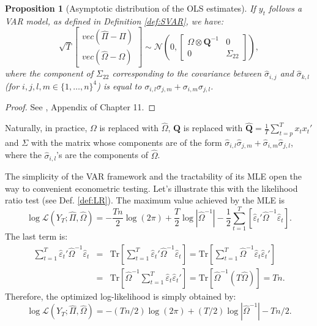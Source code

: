\documentclass[
  12pt,
]{book}
\newtheorem{proposition}{Proposition}[chapter]
\theoremstyle{definition}
\theoremstyle{definition}
\theoremstyle{definition}
\theoremstyle{definition}
\theoremstyle{remark}
\begin{document}
\begin{proposition}[Asymptotic distribution of the OLS estimates]
\protect\hypertarget{prp:OLSVAR2}{}\label{prp:OLSVAR2}If \(y_t\) follows a VAR model, as defined in Definition \ref{def:SVAR}, we have:
\begin{equation}
\sqrt{T}\left[
\begin{array}{c}
vec(\hat\Pi - \Pi)\\
vec(\hat\Omega - \Omega)
\end{array}
\right]
\sim \mathcal{N}\left(0,
\left[
\begin{array}{cc}
\Omega \otimes \mathbf{Q}^{-1} & 0\\
0 & \Sigma_{22}
\end{array}
\right]\right),\label{eq:asymptPi}
\end{equation}
where the component of \(\Sigma_{22}\) corresponding to the covariance between \(\hat\sigma_{i,j}\) and \(\hat\sigma_{k,l}\) (for \(i,j,l,m \in \{1,\dots,n\}^4\)) is equal to \(\sigma_{i,l}\sigma_{j,m}+\sigma_{i,m}\sigma_{j,l}\).
\end{proposition}

\begin{proof}
See \citet{Hamilton_1994}, Appendix of Chapter 11.
\end{proof}

Naturally, in practice, \(\Omega\) is replaced with \(\hat{\Omega}\), \(\mathbf{Q}\) is replaced with \(\hat{\mathbf{Q}} = \frac{1}{T}\sum_{t=p}^T x_t x_t'\) and \(\Sigma\) with the matrix whose components are of the form \(\hat\sigma_{i,l}\hat\sigma_{j,m}+\hat\sigma_{i,m}\hat\sigma_{j,l}\), where the \(\hat\sigma_{i,l}\)'s are the components of \(\hat\Omega\).

The simplicity of the VAR framework and the tractability of its MLE open the way to convenient econometric testing. Let's illustrate this with the likelihood ratio test (see Def. \ref{def:LR}). The maximum value achieved by the MLE is
\[
\log\mathcal{L}(Y_{T};\hat{\Pi},\hat{\Omega}) = -\frac{Tn}{2}\log(2\pi)+\frac{T}{2}\log\left|\hat{\Omega}^{-1}\right| -\frac{1}{2}\sum_{t=1}^{T}\left[\hat{\varepsilon}_{t}'\hat{\Omega}^{-1}\hat{\varepsilon}_{t}\right].
\]
The last term is:
\begin{eqnarray*}
\sum_{t=1}^{T}\hat{\varepsilon}_{t}'\hat{\Omega}^{-1}\hat{\varepsilon}_{t} &=& \mbox{Tr}\left[\sum_{t=1}^{T}\hat{\varepsilon}_{t}'\hat{\Omega}^{-1}\hat{\varepsilon}_{t}\right] = \mbox{Tr}\left[\sum_{t=1}^{T}\hat{\Omega}^{-1}\hat{\varepsilon}_{t}\hat{\varepsilon}_{t}'\right]\\
&=&\mbox{Tr}\left[\hat{\Omega}^{-1}\sum_{t=1}^{T}\hat{\varepsilon}_{t}\hat{\varepsilon}_{t}'\right] = \mbox{Tr}\left[\hat{\Omega}^{-1}\left(T\hat{\Omega}\right)\right]=Tn.
\end{eqnarray*}
Therefore, the optimized log-likelihood is simply obtained by:
\begin{equation}
\log\mathcal{L}(Y_{T};\hat{\Pi},\hat{\Omega})=-(Tn/2)\log(2\pi)+(T/2)\log\left|\hat{\Omega}^{-1}\right|-Tn/2.\label{eq:optimzedLogL}
\end{equation}
\end{document}
